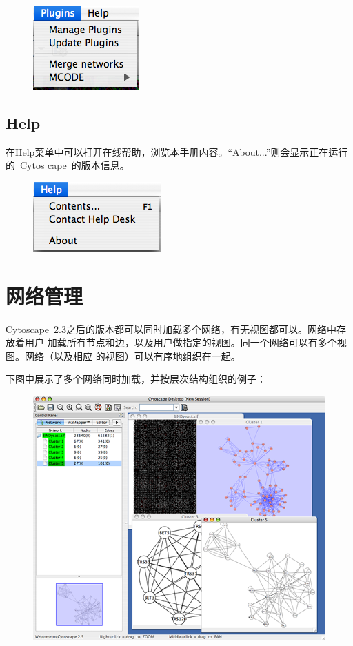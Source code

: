	\begin{figure}[!h]
	\centerline{\includegraphics[scale=0.6]{images/menu_plugins_25.png}}
	\end{figure}
	
	\subsection{Help}
	在Help菜单中可以打开在线帮助，浏览本手册内容。“About...”则会显示正在运行的~Cytos
	cape~的版本信息。
	\begin{figure}[!h]
	\centerline{\includegraphics[scale=0.6]{images/menu_help_25.png}}
	\end{figure}

\section{网络管理}
	Cytoscape~2.3之后的版本都可以同时加载多个网络，有无视图都可以。网络中存放着用户
	加载所有节点和边，以及用户做指定的视图。同一个网络可以有多个视图。网络（以及相应
	的视图）可以有序地组织在一起。

    下图中展示了多个网络同时加载，并按层次结构组织的例子：

    \begin{figure}[!h]
    \includegraphics[width=\textwidth]{images/cytoscape_network_hierarchy_25.png}
    \end{figure}

